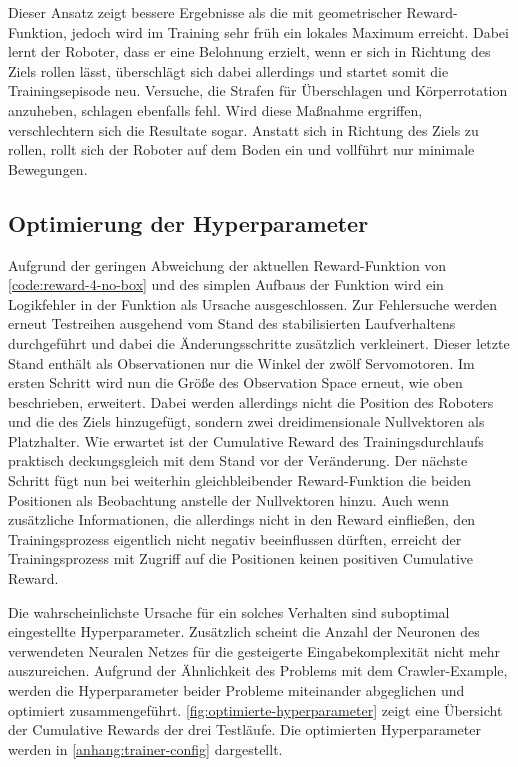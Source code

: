 Dieser Ansatz zeigt bessere Ergebnisse als die mit geometrischer Reward-Funktion, jedoch wird im Training sehr früh ein lokales Maximum erreicht.
Dabei lernt der Roboter, dass er eine Belohnung erzielt, wenn er sich in Richtung des Ziels rollen lässt, überschlägt sich dabei allerdings und startet somit die Trainingsepisode neu.
Versuche, die Strafen für Überschlagen und Körperrotation anzuheben, schlagen ebenfalls fehl.
Wird diese Maßnahme ergriffen, verschlechtern sich die Resultate sogar.
Anstatt sich in Richtung des Ziels zu rollen, rollt sich der Roboter auf dem Boden ein und vollführt nur minimale Bewegungen.

\subsection{Optimierung der Hyperparameter}
Aufgrund der geringen Abweichung der aktuellen Reward-Funktion von \autoref{code:reward-4-no-box} und des simplen Aufbaus der Funktion wird ein Logikfehler in der Funktion als Ursache ausgeschlossen.
Zur Fehlersuche werden erneut Testreihen ausgehend vom Stand des stabilisierten Laufverhaltens durchgeführt und dabei die Änderungsschritte zusätzlich verkleinert.
Dieser letzte Stand enthält als Observationen nur die Winkel der zwölf Servomotoren.
Im ersten Schritt wird nun die Größe des Observation Space erneut, wie oben beschrieben, erweitert.
Dabei werden allerdings nicht die Position des Roboters und die des Ziels hinzugefügt, sondern zwei dreidimensionale Nullvektoren als Platzhalter.
Wie erwartet ist der Cumulative Reward des Trainingsdurchlaufs praktisch deckungsgleich mit dem Stand vor der Veränderung.
Der nächste Schritt fügt nun bei weiterhin gleichbleibender Reward-Funktion die beiden Positionen als Beobachtung anstelle der Nullvektoren hinzu.
Auch wenn zusätzliche Informationen, die allerdings nicht in den Reward einfließen, den Trainingsprozess eigentlich nicht negativ beeinflussen dürften, erreicht der Trainingsprozess mit Zugriff auf die Positionen keinen positiven Cumulative Reward.

Die wahrscheinlichste Ursache für ein solches Verhalten sind suboptimal eingestellte Hyperparameter.
Zusätzlich scheint die Anzahl der Neuronen des verwendeten Neuralen Netzes für die gesteigerte Eingabekomplexität nicht mehr auszureichen.
Aufgrund der Ähnlichkeit des Problems mit dem Crawler-Example, werden die Hyperparameter beider Probleme miteinander abgeglichen und optimiert zusammengeführt.
\autoref{fig:optimierte-hyperparameter} zeigt eine Übersicht der Cumulative Rewards der drei Testläufe.
Die optimierten Hyperparameter werden in \autoref{anhang:trainer-config} dargestellt.

